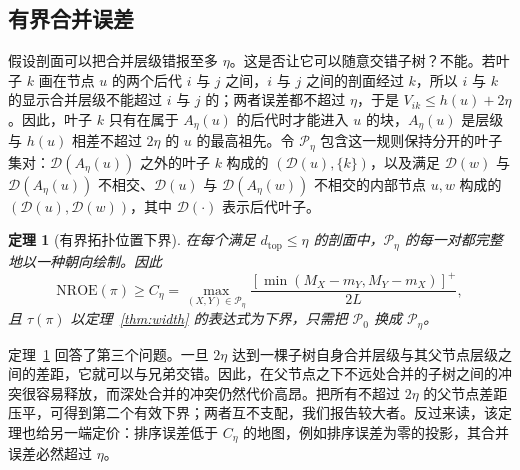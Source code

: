 \documentclass[preprint]{vgtc_zh}   %
\newtheorem{theorem}{定理}
\newcommand{\dtop}{d_{\mathrm{top}}}
\newcommand{\nroe}{\mathrm{NROE}}
\begin{document}
\subsection{有界合并误差}
假设剖面可以把合并层级错报至多 $\eta$。这是否让它可以随意交错子树？不能。若叶子 $k$ 画在节点 $u$ 的两个后代 $i$ 与 $j$ 之间，$i$ 与 $j$ 之间的剖面经过 $k$，所以 $i$ 与 $k$ 的显示合并层级不能超过 $i$ 与 $j$ 的；两者误差都不超过 $\eta$，于是 $V_{ik}\le h(u)+2\eta$。因此，叶子 $k$ 只有在属于 $A_\eta(u)$ 的后代时才能进入 $u$ 的块，$A_\eta(u)$ 是层级与 $h(u)$ 相差不超过 $2\eta$ 的 $u$ 的最高祖先。令 $\mathcal{P}_\eta$ 包含这一规则保持分开的叶子集对：$\mathcal{D}(A_\eta(u))$ 之外的叶子 $k$ 构成的 $(\mathcal{D}(u),\{k\})$，以及满足 $\mathcal{D}(w)$ 与 $\mathcal{D}(A_\eta(u))$ 不相交、$\mathcal{D}(u)$ 与 $\mathcal{D}(A_\eta(w))$ 不相交的内部节点 $u,w$ 构成的 $(\mathcal{D}(u),\mathcal{D}(w))$，其中 $\mathcal{D}(\cdot)$ 表示后代叶子。
\begin{theorem}[有界拓扑位置下界]\label{thm:chain}
在每个满足 $\dtop\le\eta$ 的剖面中，$\mathcal{P}_\eta$ 的每一对都完整地以一种朝向绘制。因此
\begin{equation}\label{eq:chainbounds}
 \nroe(\pi)\ge C_\eta=\max_{(X,Y)\in\mathcal{P}_\eta}\frac{[\min(M_X-m_Y,M_Y-m_X)]^+}{2L},
\end{equation}
且 $\tau(\pi)$ 以定理~\ref{thm:width} 的表达式为下界，只需把 $\mathcal{P}_0$ 换成 $\mathcal{P}_\eta$。
\end{theorem}
定理~\ref{thm:chain} 回答了第三个问题。一旦 $2\eta$ 达到一棵子树自身合并层级与其父节点层级之间的差距，它就可以与兄弟交错。因此，在父节点之下不远处合并的子树之间的冲突很容易释放，而深处合并的冲突仍然代价高昂。把所有不超过 $2\eta$ 的父节点差距压平，可得到第二个有效下界；两者互不支配，我们报告较大者。反过来读，该定理也给另一端定价：排序误差低于 $C_\eta$ 的地图，例如排序误差为零的投影，其合并误差必然超过 $\eta$。
\end{document}
